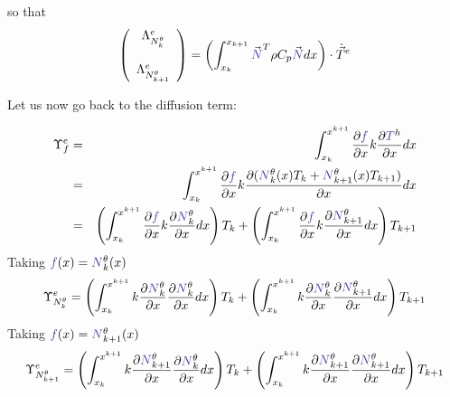 so that 
\[
\left(
\begin{array}{c}
{\Lambda}_{N_k^\theta}^e \\  \\ {\Lambda}_{N_{k+1}^\theta}^e
\end{array}
\right)
=
\left( \int_{x_k}^{x_{k+1}}   {\vec {\color{Violet}N}}^T \rho C_p  {\vec {\color{Violet}N}} dx  \right) \cdot \dot{\vec T}^e
\]

Let us now go back to the diffusion term:

\begin{eqnarray}
{\Upsilon}_f^e &=&
\int_{x_k}^{x^{k+1}} \frac{\partial {\color{Violet}f}}{\partial x} k \frac{\partial {\color{Violet}T}^h}{\partial x} dx \nn\\
&=&
\int_{x_k}^{x^{k+1}} \frac{\partial {\color{Violet}f}}{\partial x} k \frac{\partial  ({\color{Violet}N}_{k}^\theta(x) T_k 
+ {\color{Violet}N}_{k+1}^\theta(x) T_{k+1} ) }{\partial x} dx  \nn\\
&=&
\left( \int_{x_k}^{x^{k+1}} \frac{\partial {\color{Violet}f}}{\partial x}  k \frac{\partial  {\color{Violet}N}_{k}^\theta } {\partial x}  dx \right)  T_k 
+ \left( \int_{x_k}^{x^{k+1}} \frac{\partial {\color{Violet}f}}{\partial x}  k \frac{\partial  {\color{Violet}N}_{k+1}^\theta } {\partial x} dx \right) T_{k+1}  \nn
\end{eqnarray}
Taking ${\color{Violet}f}(x)={\color{Violet}N}_k^\theta(x)$ 
\[
{\Upsilon}_{N_k^\theta}^e=
  \left( \int_{x_k}^{x^{k+1}} k\frac{\partial {\color{Violet}N}_k^\theta}{\partial x}  \frac{\partial  {\color{Violet}N}_{k}^\theta } {\partial x}  dx \right)  T_k 
+ \left( \int_{x_k}^{x^{k+1}} k\frac{\partial {\color{Violet}N}_k^\theta}{\partial x}  \frac{\partial  {\color{Violet}N}_{k+1}^\theta } {\partial x} dx \right) T_{k+1}  \nn
\]
Taking ${\color{Violet}f}(x)={\color{Violet}N}_{k+1}^\theta(x)$ 
\[
{\Upsilon}_{N_{k+1}^\theta}^e=
  \left( \int_{x_k}^{x^{k+1}} k\frac{\partial {\color{Violet}N}_{k+1}^\theta}{\partial x}  \frac{\partial  {\color{Violet}N}_{k}^\theta } {\partial x}  dx \right)  T_k 
+ \left( \int_{x_k}^{x^{k+1}} k\frac{\partial {\color{Violet}N}_{k+1}^\theta}{\partial x}  \frac{\partial  {\color{Violet}N}_{k+1}^\theta } {\partial x} dx \right) T_{k+1}  \nn
\]


